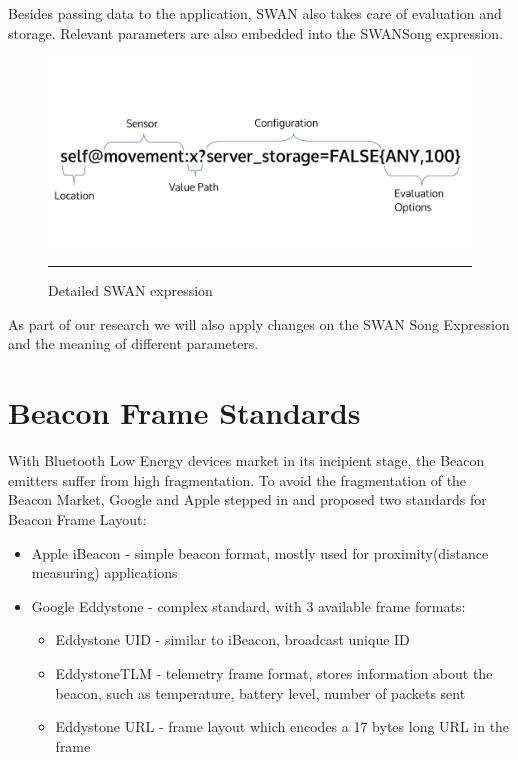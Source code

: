 Besides passing data to the application, SWAN also takes care of evaluation and storage. Relevant parameters are also embedded into the 
SWANSong expression.


\begin{figure}[htbp]
  \centering
    \includegraphics[scale=0.6]{Figures/swan_expr.pdf}
    \rule{35em}{0.5pt}
  \caption[Swan Expression]{Detailed SWAN expression}
  \label{fig:SwanExpression}
\end{figure}

As part of our research we will also apply changes on the SWAN Song Expression and the meaning of different parameters.

\section{Beacon Frame Standards}
With Bluetooth Low Energy devices market in its incipient stage, the Beacon  emitters suffer from high fragmentation.
To avoid the fragmentation of the Beacon Market, Google and Apple stepped in and proposed two standards for Beacon Frame Layout:

\begin{itemize}
 \item Apple iBeacon - simple beacon format, mostly used for proximity(distance measuring) applications
 \item Google Eddystone - complex standard, with 3 available frame formats:
 \begin{itemize}
  \item Eddystone UID - similar to iBeacon, broadcast unique ID
  \item EddystoneTLM - telemetry frame format, stores information about the beacon, such as temperature, battery level, number of packets sent
  \item Eddystone URL - frame layout which encodes a 17 bytes long URL in the frame
 \end{itemize}
\end{itemize}

